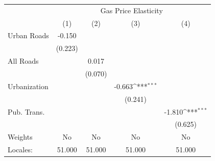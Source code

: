 {
\def\sym#1{\ifmmode^{#1}\else\(^{#1}\)\fi}
\begin{tabular}{l*{4}{c}}
\hline\hline
            &\multicolumn{4}{c}{Gas Price Elasticity}                                               \\
            &\multicolumn{1}{c}{(1)}         &\multicolumn{1}{c}{(2)}         &\multicolumn{1}{c}{(3)}         &\multicolumn{1}{c}{(4)}         \\
\hline
Urban Roads &      -0.150         &                     &                     &                     \\
            &     (0.223)         &                     &                     &                     \\
[1em]
All Roads   &                     &       0.017         &                     &                     \\
            &                     &     (0.070)         &                     &                     \\
[1em]
Urbanization&                     &                     &      -0.663\sym{***}&                     \\
            &                     &                     &     (0.241)         &                     \\
[1em]
Pub. Trans. &                     &                     &                     &      -1.810\sym{***}\\
            &                     &                     &                     &     (0.625)         \\
\hline
Weights     &          No         &          No         &          No         &          No         \\
Locales:    &      51.000         &      51.000         &      51.000         &      51.000         \\
\hline\hline
\end{tabular}
}
